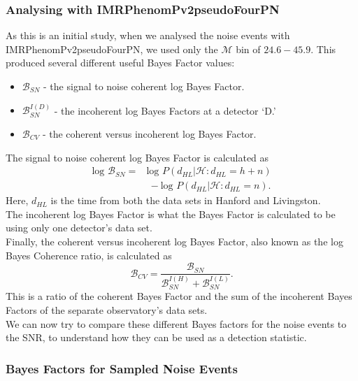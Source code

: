 \documentclass{article}
\begin{document}
\subsubsection{Analysing with IMRPhenomPv2pseudoFourPN}
As this is an initial study, when we analysed the noise events with IMRPhenomPv2pseudoFourPN, we used only the $\mathcal{M}$ bin of $24.6  - 45.9$. This produced several different useful Bayes Factor values: 

\begin{itemize}
	\item  $\mathcal{B}_{SN}$ - the signal to noise coherent log Bayes Factor.
	\item  $\mathcal{B}_{SN}^{I(D)}$ - the incoherent log Bayes Factors at a detector `D.'
	\item  $\mathcal{B}_{CV}$ - the coherent versus incoherent log Bayes Factor.
\end{itemize}

The signal to noise coherent log Bayes Factor is calculated as 
\begin{align} \label{eq:logBayesFactor}
\text{log }\mathcal{B}_{SN} =& \text{log }P(d_{HL} | \mathcal{H} : d_{HL} = h + n)  \nonumber\\ 
&\ - \text{log }P(d_{HL} | \mathcal{H} : d_{HL} =  n) .
\end{align}
Here, $d_{HL}$ is the time from both the data sets in Hanford and Livingston. \\

The incoherent log Bayes Factor is what the Bayes Factor is calculated to be using only one detector's data set. \\ 

Finally, the coherent versus incoherent log Bayes Factor, also known as the log Bayes Coherence ratio, is calculated as 
 \begin{equation}\label{eq:BCR}
 \mathcal{B}_{CV} = \frac{\mathcal{B}_{SN}}{\mathcal{B}_{SN}^{I(H)}+\mathcal{B}_{SN}^{I(L)}}.
 \end{equation}
This is a ratio of the coherent Bayes Factor and the sum of the incoherent Bayes Factors of the separate observatory's data sets.\\

We can now try to compare these different Bayes factors for the noise events to the SNR, to understand how they can be used as a detection statistic. \\



        
 \subsubsection{Bayes Factors for Sampled Noise Events}
 
\end{document}
